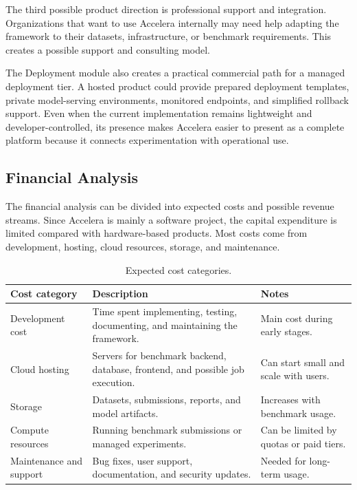 \documentclass[12pt,a4paper]{report}
\newcommand{\acceleraTableStyle}{%
\small
\renewcommand{\arraystretch}{1.15}
\setlength{\tabcolsep}{4pt}%
}
\begin{document}
The third possible product direction is professional support and integration.
Organizations that want to use Accelera internally may need help adapting the
framework to their datasets, infrastructure, or benchmark requirements. This
creates a possible support and consulting model.

The Deployment module also creates a practical commercial path for a managed
deployment tier. A hosted product could provide prepared deployment templates,
private model-serving environments, monitored endpoints, and simplified rollback
support. Even when the current implementation remains lightweight and
developer-controlled, its presence makes Accelera easier to present as a
complete platform because it connects experimentation with operational use.

\subsection{Financial Analysis}

The financial analysis can be divided into expected costs and possible revenue
streams. Since Accelera is mainly a software project, the capital expenditure is
limited compared with hardware-based products. Most costs come from development,
hosting, cloud resources, storage, and maintenance.

\begin{table}[!htbp]
\centering
\acceleraTableStyle
\caption{Expected cost categories.}
\label{tab:expected-costs}
\begin{tabular}{p{}p{}p{}}
\toprule
\textbf{Cost category} & \textbf{Description} & \textbf{Notes} \\
\midrule

Development cost &
Time spent implementing, testing, documenting, and maintaining the framework. &
Main cost during early stages. \\
\midrule

Cloud hosting &
Servers for benchmark backend, database, frontend, and possible job execution. &
Can start small and scale with users. \\
\midrule

Storage &
Datasets, submissions, reports, and model artifacts. &
Increases with benchmark usage. \\
\midrule

Compute resources &
Running benchmark submissions or managed experiments. &
Can be limited by quotas or paid tiers. \\
\midrule

Maintenance and support &
Bug fixes, user support, documentation, and security updates. &
Needed for long-term usage. \\

\bottomrule
\end{tabular}
\end{table}
\end{document}
